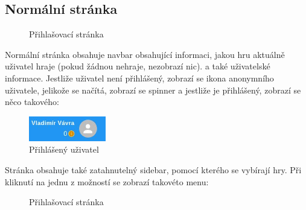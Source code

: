 \documentclass[a4paper,oneside,12pt]{report}
\begin{document}
\subsection{Normální stránka}
\begin{figure}[H]
   \centering
   \caption[Přihlašovací stránka]{Přihlašovací stránka}
   \label{fig:architecture}
\end{figure}

Normální stránka obsahuje navbar obsahující informaci, jakou hru aktuálně uživatel hraje (pokud žádnou nehraje, nezobrazí nic). a také uživatelské informace. Jestliže uživatel není přihlášený, zobrazí se ikona anonymního uživatele, jelikože se načítá, zobrazí se spinner a jestliže je přihlášený, zobrazí se něco takového: 

\begin{figure}[H]
   \centering
   \includegraphics[width=0.3\textwidth]{../img/vladimirIcon.jpg}
   \caption[Přihlášený uživatel]{Přihlášený uživatel}
   \label{fig:architecture}
\end{figure}

Stránka obsahuje také zatahnutelný sidebar, pomocí kterého se vybírají hry. Při kliknutí na jednu z možností se zobrazí takovéto menu:

\begin{figure}[H]
   \centering
   \caption[Přihlašovací stránka]{Přihlašovací stránka}
   \label{fig:architecture}
\end{figure}
\end{document}
